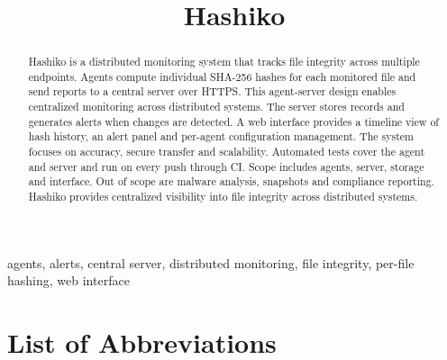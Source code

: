\documentclass[conference]{IEEEtran}
\begin{document}
\title{Hashiko\\
}

\author{
}

\maketitle

\begin{abstract}
Hashiko is a distributed monitoring system that tracks file integrity across multiple endpoints. Agents compute individual SHA-256 hashes for each monitored file and send reports to a central server over HTTPS. This agent-server design enables centralized monitoring across distributed systems. The server stores records and generates alerts when changes are detected. A web interface provides a timeline view of hash history, an alert panel and per-agent configuration management. The system focuses on accuracy, secure transfer and scalability. Automated tests cover the agent and server and run on every push through CI. Scope includes agents, server, storage and interface. Out of scope are malware analysis, snapshots and compliance reporting. Hashiko provides centralized visibility into file integrity across distributed systems.
\end{abstract}

\begin{IEEEkeywords}
    agents, alerts, central server, distributed monitoring, file integrity, per-file hashing, web interface
\end{IEEEkeywords}

\section*{List of Abbreviations}
\end{document}
